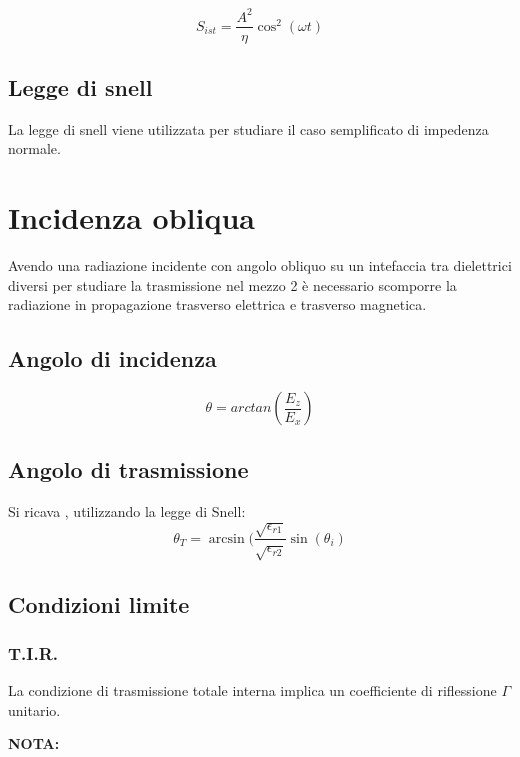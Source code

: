 \documentclass[10pt,a4paper]{report}
\begin{document}
		\begin{equation}
		S_{ist}=\frac{A^2}{\eta}\cos^2(\omega t)
		\end{equation}
	
	\section{Legge di snell}

	La legge di snell viene utilizzata per studiare il caso semplificato di impedenza normale.

\chapter{Incidenza obliqua}

	Avendo una radiazione incidente con angolo obliquo su un intefaccia tra dielettrici diversi per studiare la trasmissione nel mezzo 2 è necessario scomporre la radiazione in propagazione trasverso elettrica e trasverso magnetica.

	\section{Angolo di incidenza}

		\begin{equation}
		\theta=arctan(\frac{E_z}{E_x})
		\end{equation}



	\section{Angolo di trasmissione}
	Si ricava , utilizzando la legge di Snell:
	\begin{equation}
	\theta_T=\arcsin(\frac{\sqrt{\epsilon_{r1}}}{\sqrt{\epsilon_{r2}}}\sin(\theta_i)
	\label{eq:leggedisnell}
	\end{equation} 
	
	\section{Condizioni limite}

		\subsection{T.I.R.}
			La condizione di trasmissione totale interna implica un coefficiente di riflessione $\Gamma$ unitario.

			\textbf{NOTA:}
\end{document}
